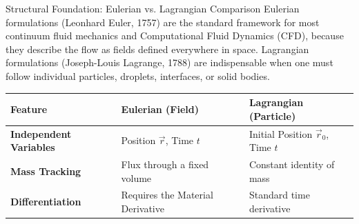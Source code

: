 \begin{mainbox}{Structural Foundation: Eulerian vs. Lagrangian Comparison}
Eulerian formulations (Leonhard Euler, 1757) are the standard framework for most continuum fluid mechanics and Computational Fluid Dynamics (CFD), because they describe the flow as fields defined everywhere in space. Lagrangian formulations (Joseph-Louis Lagrange, 1788) are indispensable when one must follow individual particles, droplets, interfaces, or solid bodies.
\vspace{0.2cm}

\begin{tabular}{@{}lll@{}}
\toprule
\textbf{Feature} & \textbf{Eulerian (Field)} & \textbf{Lagrangian (Particle)} \\
\midrule
\textbf{Independent Variables} & Position $\vec{r}$, Time $t$ & Initial Position $\vec{r}_0$, Time $t$ \\
\textbf{Mass Tracking} & Flux through a fixed volume & Constant identity of mass \\
\textbf{Differentiation} & Requires the Material Derivative & Standard time derivative \\
\bottomrule
\end{tabular}
\end{mainbox}